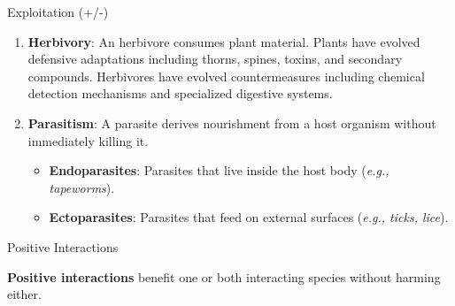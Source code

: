 \documentclass[10pt]{article}
\begin{document}
\begin{core}{Exploitation (+/-)}
\begin{enumerate}
\begin{itemize}
        \end{itemize}

        It is important to note that predators, too, develop adaptations that enhance their hunting efficiency. For instance, certain octopus species employ mimicry to approach prey undetected, while terrestrial predators such as the cheetah have evolved powerful musculature and skeletal structure to pursue and overtake fast-moving prey.

        \item \textbf{Herbivory}: An herbivore consumes plant material. Plants have evolved defensive adaptations including thorns, spines, toxins, and secondary compounds. Herbivores have evolved countermeasures including chemical detection mechanisms and specialized digestive systems.

        \item \textbf{Parasitism}: A parasite derives nourishment from a host organism without immediately killing it.

        \begin{itemize}

          \item \textbf{Endoparasites}: Parasites that live inside the host body (\textit{e.g., tapeworms}).

          \item \textbf{Ectoparasites}: Parasites that feed on external surfaces (\textit{e.g., ticks, lice}).

        \end{itemize}

      \end{enumerate}

    \end{core}

    \begin{core}{Positive Interactions}

      \textbf{Positive interactions} benefit one or both interacting species without harming either.

      \begin{enumerate}



      \end{enumerate}

    \end{core}
\end{document}
